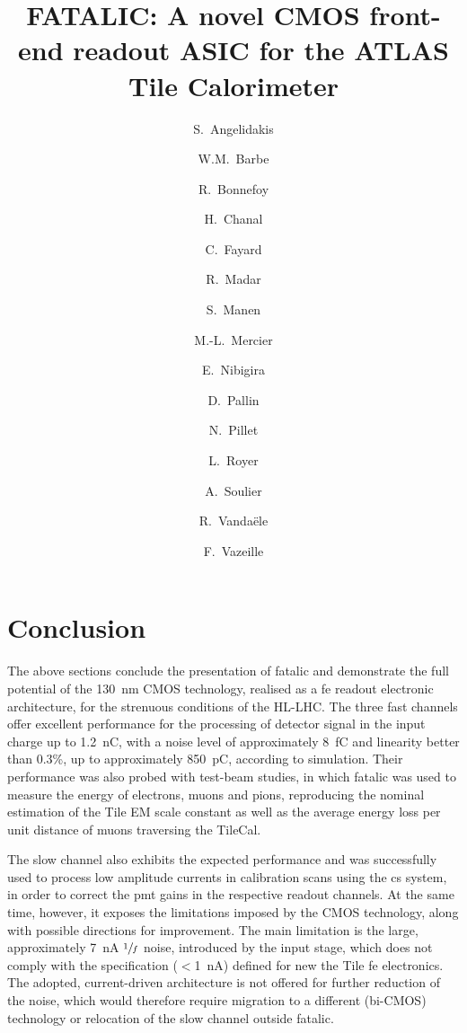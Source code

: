 \documentclass[a4paper,11pt]{article}
\title{FATALIC: A novel CMOS front-end readout ASIC for the ATLAS Tile Calorimeter}
\author[]{S.~Angelidakis}
\author[]{W.M.~Barbe}
\author[]{R.~Bonnefoy}
\author[]{H.~Chanal}
\author[]{C.~Fayard}
\author[]{R.~Madar}
\author[]{S.~Manen}
\author[]{M.-L.~Mercier}
\author[]{E.~Nibigira}
\author[]{D.~Pallin}
\author[]{N.~Pillet}
\author[]{L.~Royer}
\author[]{A.~Soulier}
\author[]{R.~Vanda\"ele}
\author[]{F.~Vazeille}
\affiliation[]{Laboratoire de Physique de Clermont-Ferrand, CNRS/IN2P3, Universit\'e Clermont Auvergne}
\begin{document}
\maketitle
\clearpage







\section{Conclusion}
\label{sec:conclusion}
The above sections conclude the presentation of \gls{fatalic} and demonstrate the full potential of the \SI{130}{nm} CMOS 
technology, realised as a \gls{fe} readout electronic architecture, for the strenuous conditions of the HL-LHC. The three 
fast channels offer excellent performance for the processing of detector signal in the input charge up to \SI{1.2}{nC},
with a noise level of approximately \SI{8}{fC} and linearity better than 0.3\%, up to approximately \SI{850}{pC}, according
to simulation. Their performance was also probed with test-beam studies, in which \gls{fatalic} was used to measure the 
energy of electrons, muons and pions, reproducing the nominal estimation of the Tile EM scale constant as well as the
average energy loss per unit distance of muons traversing the TileCal.

The slow channel also exhibits the expected performance and was successfully used to process low amplitude currents in 
calibration scans using the \gls{cs} system, in order to correct the \gls{pmt} gains in the respective readout channels. 
At the same time, however, it exposes the limitations imposed by the CMOS technology, along with possible directions for 
improvement. The main limitation is the large, approximately \SI{7}{nA} $\sfrac{1}{f}$ noise, introduced by the input 
stage, which does not comply with the specification ($<$\SI{1}{nA}) defined for new the Tile \gls{fe} electronics. The 
adopted, current-driven architecture is not offered for further reduction of the noise, which would therefore require 
migration to a different (bi-CMOS) technology or relocation of the slow channel outside \gls{fatalic}.

\clearpage


\end{document}
